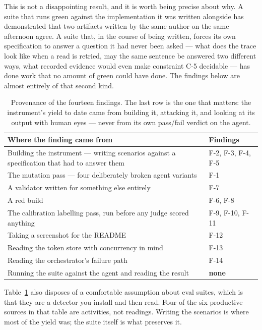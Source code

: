 \documentclass[11pt,a4paper]{article}
\begin{document}
This is not a disappointing result, and it is worth being precise about why. A
suite that runs green against the implementation it was written alongside has
demonstrated that two artifacts written by the same author on the same afternoon
agree. A suite that, in the course of being written, forces its own
specification to answer a question it had never been asked --- what does the
trace look like when a read is retried, may the same sentence be answered two
different ways, what recorded evidence would even make constraint C-5 decidable
--- has done work that no amount of green could have done. The findings below
are almost entirely of that second kind.

\begin{table}[htbp]
\centering
\small
\begin{tabularx}{\textwidth}{@{}Xp{3.4cm}@{}}
\toprule
\textbf{Where the finding came from} & \textbf{Findings} \\
\midrule
Building the instrument --- writing scenarios against a specification that had
to answer them & F-2, F-3, F-4, F-5 \\
The mutation pass --- four deliberately broken agent variants & F-1 \\
A validator written for something else entirely & F-7 \\
A red build & F-6, F-8 \\
The calibration labelling pass, run before any judge scored anything & F-9, F-10, F-11 \\
Taking a screenshot for the README & F-12 \\
Reading the token store with concurrency in mind & F-13 \\
Reading the orchestrator's failure path & F-14 \\
\midrule
Running the suite against the agent and reading the result & \textcolor{accentred}{\textbf{none}} \\
\bottomrule
\end{tabularx}
\caption{Provenance of the fourteen findings. The last row is the one that matters: the instrument's yield to date came from building it, attacking it, and looking at its output with human eyes --- never from its own pass/fail verdict on the agent.}
\label{tab:provenance}
\end{table}

Table~\ref{tab:provenance} also disposes of a comfortable assumption about eval
suites, which is that they are a detector you install and then read. Four of the
six productive sources in that table are activities, not readings. Writing the
scenarios is where most of the yield was; the suite itself is what preserves it.
\end{document}
